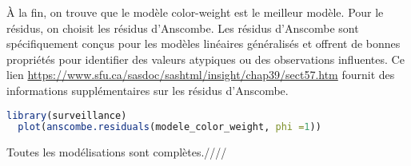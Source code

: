 \documentclass[../main.tex]{subfiles}
\begin{document}
\begin{CJK*}{UTF8}{gbsn}
\begin {lstlisting}[language=R]
\end{lstlisting}

À la fin, on trouve que le modèle color-weight est le meilleur modèle.
Pour le résidus, on choisit les résidus d'Anscombe. 
Les résidus d'Anscombe sont spécifiquement conçus pour 
les modèles linéaires généralisés et 
offrent de bonnes propriétés pour identifier des valeurs atypiques ou des observations influentes. 
Ce lien \url{https://www.sfu.ca/sasdoc/sashtml/insight/chap39/sect57.htm} 
fournit des informations supplémentaires sur les résidus d'Anscombe.

\begin {lstlisting}[language=R]
  library(surveillance)
  plot(anscombe.residuals(modele_color_weight, phi =1))
\end{lstlisting}

Toutes les modélisations sont complètes.////
\end{CJK*}
\end{document}
